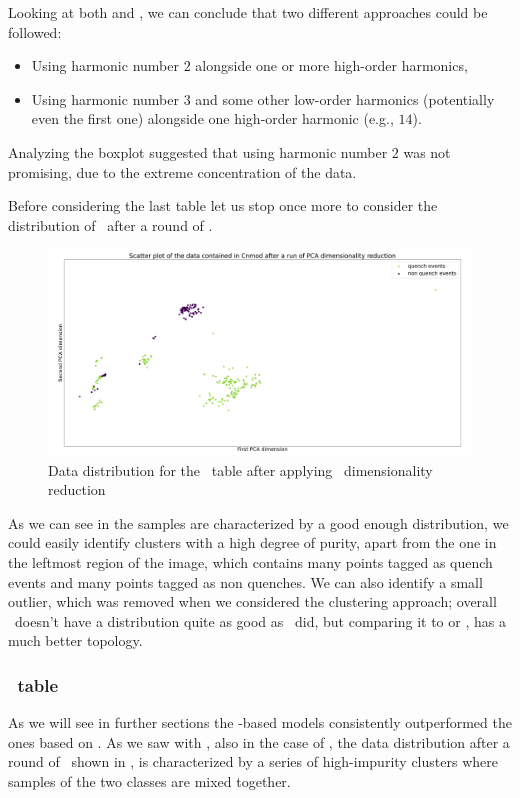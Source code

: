 Looking at both  and , we can conclude that two different
approaches could be followed:
\begin{itemize}
	\item Using harmonic number $2$ alongside one or more high-order harmonics,
	\item Using harmonic number $3$ and some other low-order harmonics (potentially even the
	      first one) alongside one high-order harmonic (e.g., $14$).
\end{itemize}
Analyzing the boxplot suggested that using harmonic number $2$ was not promising, due to the extreme
concentration of the data.

Before considering the last table let us stop once more to consider the distribution of \cnmod\
after a round of \pca.
\begin{figure}[h!]
	\centering
	\includegraphics[width=\linewidth]{img/Cnmod_distribution.png}
	\caption{Data distribution for the \cnmod\ table after applying \pca\ dimensionality
		reduction} \label{fig:cnmod-dist}
\end{figure}
As we can see in  the samples are characterized by a good enough distribution,
we could easily identify clusters with a high degree of purity, apart from the one in the leftmost
region of the image, which contains many points tagged as quench events and many points tagged as
non quenches. We can also identify a small outlier, which was removed when we considered the
clustering approach; overall \cnmod\ doesn't have a distribution quite as good as \an\ did, but
comparing it to \Cref{fig:bn-dist} or \Cref{fig:phi-dist}, has a much better topology.

\subsubsection{\phin\ table}
As we will see in further sections the \phin-based models consistently outperformed the ones based
on \bn. As we saw with \bn, also in the case of \phin, the data distribution after a round of \pca\,
shown in \Cref{fig:phi-dist}, is characterized by a series of high-impurity clusters where samples of the two
classes are mixed together.

